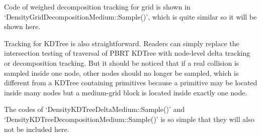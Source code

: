 \documentclass[acmtog]{acmart}
\begin{document}
\lstset{basicstyle=\small\ttfamily}
Code of weighed decomposition tracking for grid is shown in `DensityGridDecompositionMedium::Sample()', 
which is quite similar so it will be shown here.\par
Tracking for KDTree is also straightforward.
Readers can simply replace the intersection testing of traversal of PBRT KDTree with node-level delta tracking or decomposition tracking.
But it should be noticed that if a real collision is sampled inside one node, other nodes should no longer be sampled, 
which is different from a KDTree containing primitives because a primitive may be located inside many nodes but a medium-grid block is located inside exactly one node.\par
The codes of `DensityKDTreeDeltaMedium::Sample()' and `DensityKDTreeDecompositionMedium::Sample()' is so simple that they will also not be included here.
\end{document}
